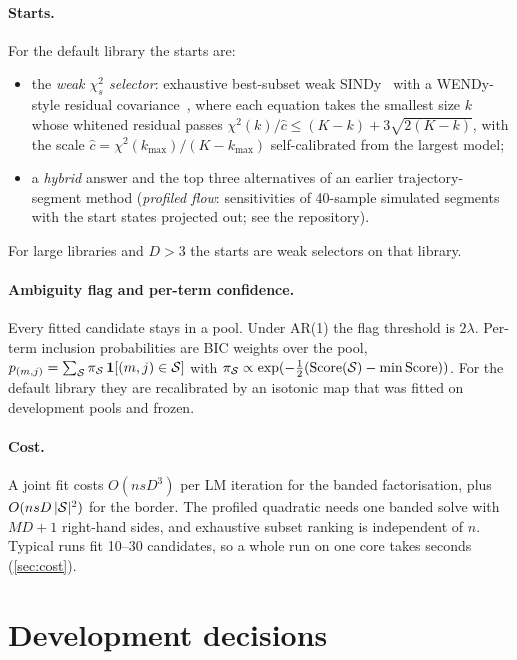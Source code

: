 \paragraph{Starts.} For the default library the starts are:
\begin{itemize}[leftmargin=*,itemsep=1pt]
\item the \emph{weak $\chi^2_s$ selector}: exhaustive best-subset weak SINDy~\citep{messenger2021wsindy} with a WENDy-style residual covariance~\citep{bortz2023wendy}, where each equation takes the smallest size $k$ whose whitened residual passes $\chi^2(k)/\hat c\le(K-k)+3\sqrt{2(K-k)}$, with the scale $\hat c=\chi^2(k_{\max})/(K-k_{\max})$ self-calibrated from the largest model;
\item a \emph{hybrid} answer and the top three alternatives of an earlier trajectory-segment method (\emph{profiled flow}: sensitivities of 40-sample simulated segments with the start states projected out; see the repository).
\end{itemize}
For large libraries and $D>3$ the starts are weak selectors on that library.

\paragraph{Ambiguity flag and per-term confidence.} Every fitted candidate stays in a pool. Under AR(1) the flag threshold is $2\lambda$. Per-term inclusion probabilities are BIC weights over the pool, $p_{(m,j)}=\sum_{\mathcal{S}}\pi_{\mathcal{S}}\,\mathbf 1[(m,j)\in\mathcal{S}]$ with $\pi_{\mathcal{S}}\propto\exp(-\tfrac12(\mathrm{Score}(\mathcal{S})-\min\mathrm{Score}))$. For the default library they are recalibrated by an isotonic map that was fitted on development pools and frozen.

\paragraph{Cost.} A joint fit costs $O(n s D^3)$ per LM iteration for the banded factorisation, plus $O(n s D\,|\mathcal{S}|^2)$ for the border. The profiled quadratic needs one banded solve with $MD+1$ right-hand sides, and exhaustive subset ranking is independent of $n$. Typical runs fit 10--30 candidates, so a whole run on one core takes seconds (\cref{sec:cost}).

\section{Development decisions}
\label{app:dev}


